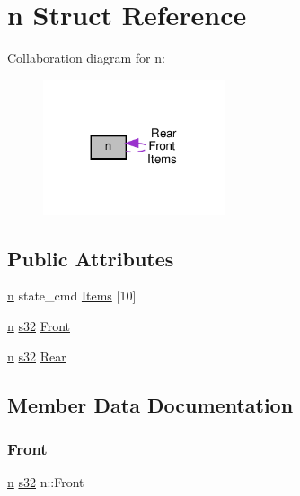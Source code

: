 \hypertarget{structn}{}\section{n Struct Reference}
\label{structn}


Collaboration diagram for n\+:\nopagebreak
\begin{figure}[H]
\begin{center}
\leavevmode
\includegraphics[width=152pt]{df/def/structn__coll__graph}
\end{center}
\end{figure}
\subsection*{Public Attributes}
\begin{DoxyCompactItemize}
\item 
\hyperlink{structn}{n} state\+\_\+cmd \hyperlink{structn_aa86135b44bdda3f39f31e653b9b1d959}{Items} \mbox{[}10\mbox{]}
\item 
\hyperlink{structn}{n} \hyperlink{ab__common_8h_ae9b1af5c037e57a98884758875d3a7c4}{s32} \hyperlink{structn_aac2a7e440b503d7e38c905145522dc4f}{Front}
\item 
\hyperlink{structn}{n} \hyperlink{ab__common_8h_ae9b1af5c037e57a98884758875d3a7c4}{s32} \hyperlink{structn_ab3dbe3587b54eb3d74ed1baf3387d15c}{Rear}
\end{DoxyCompactItemize}


\subsection{Member Data Documentation}
\mbox{\label{structn_aac2a7e440b503d7e38c905145522dc4f}} 
\subsubsection{\texorpdfstring{Front}{Front}}
{\footnotesize\ttfamily \hyperlink{structn}{n} \hyperlink{ab__common_8h_ae9b1af5c037e57a98884758875d3a7c4}{s32} n\+::\+Front}

